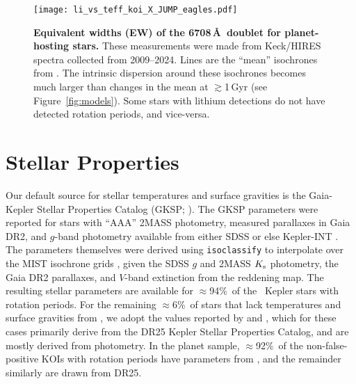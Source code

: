 \documentclass[11pt,twocolumn,tighten]{aastex63}
\newcommand{\fracstarswithprotwithbtwenty}{{$\approx$94\%}}
\newcommand{\fracstarswithprotwithoutbtwenty}{{$\approx$6\%}}
\newcommand{\frackoisnofpwithprotwithbtwenty}{{$\approx$92\%}}
\begin{document}
\begin{figure}[!t]
	\begin{center}
		\leavevmode
		\texttt{[image: li\_vs\_teff\_koi\_X\_JUMP\_eagles.pdf]}
	\end{center}
	\vspace{-0.25cm}
	\caption{{\bf Equivalent widths (EW) of the  6708\,\AA\ doublet
    for planet-hosting stars.} These measurements were made from
    Keck/HIRES spectra collected from 2009--2024.  Lines are the ``mean''
    isochrones from \citet{Jeffries_2023}.  The
    intrinsic dispersion around these isochrones becomes much larger
    than changes in the mean at $\gtrsim$1\,Gyr (see
    Figure~\ref{fig:models}).  Some stars with lithium detections do
    not have detected rotation periods, and vice-versa.
		\label{fig:li_vs_teff}
	}
\end{figure}



\section{Stellar Properties}
\label{sec:stellarprops}




Our default source for stellar temperatures and surface gravities is
the Gaia-Kepler Stellar Properties Catalog (GKSP;
\citealt{Berger_2020a_catalog}).  The GKSP parameters were reported
for stars with ``AAA'' 2MASS photometry, measured parallaxes in Gaia
DR2,  and $g$-band photometry available from either SDSS or else Kepler-INT
\citep{2012AJ....144...24G}.  The parameters themselves were derived using
\texttt{isoclassify} \citep{2017ApJ...844..102H} to interpolate over
the MIST isochrone grids \citep{Choi_2016,2016ApJS..222....8D}, given
the SDSS $g$ and 2MASS $K_{\rm s}$ photometry, the Gaia DR2
parallaxes, and $V$-band extinction from the
\citet{2019ApJ...887...93G} reddening map.  The resulting stellar
parameters are available for \fracstarswithprotwithbtwenty\ of the
\nuniqstarsantosrot\ Kepler stars with rotation periods.  For the
remaining \fracstarswithprotwithoutbtwenty\ of stars that lack
temperatures and surface gravities from
, we adopt the values reported by
\citet{Santos_2019} and \citet{Santos_2021}, which for these cases
primarily derive from the \citet{Mathur_2017} DR25 Kepler Stellar
Properties Catalog, and are mostly derived from photometry.  In the
planet sample, \frackoisnofpwithprotwithbtwenty\ of the
non-false-positive KOIs with rotation periods have parameters from
\citet{Berger_2020a_catalog}, and the remainder similarly are drawn
from DR25. 
\end{document}
